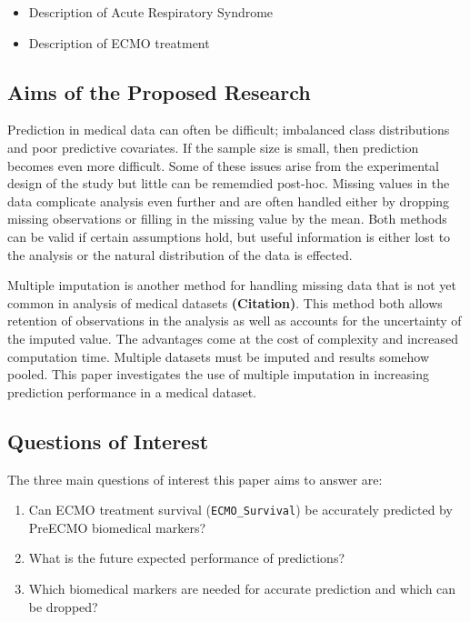 \documentclass[12pt,]{article}
\providecommand{\tightlist}{%
  \setlength{\itemsep}{0pt}\setlength{\parskip}{0pt}}
\begin{document}
\begin{itemize}
\tightlist
\item
  Description of Acute Respiratory Syndrome
\item
  Description of ECMO treatment
\end{itemize}

\subsection{Aims of the Proposed
Research}\label{aims-of-the-proposed-research}

Prediction in medical data can often be difficult; imbalanced class
distributions and poor predictive covariates. If the sample size is
small, then prediction becomes even more difficult. Some of these issues
arise from the experimental design of the study but little can be
rememdied post-hoc. Missing values in the data complicate analysis even
further and are often handled either by dropping missing observations or
filling in the missing value by the mean. Both methods can be valid if
certain assumptions hold, but useful information is either lost to the
analysis or the natural distribution of the data is effected.

Multiple imputation is another method for handling missing data that is
not yet common in analysis of medical datasets \textbf{(Citation)}. This
method both allows retention of observations in the analysis as well as
accounts for the uncertainty of the imputed value. The advantages come
at the cost of complexity and increased computation time. Multiple
datasets must be imputed and results somehow pooled. This paper
investigates the use of multiple imputation in increasing prediction
performance in a medical dataset.

\subsection{Questions of Interest}\label{questions-of-interest}

The three main questions of interest this paper aims to answer are:

\begin{enumerate}
\def\labelenumi{\arabic{enumi}.}
\tightlist
\item
  Can ECMO treatment survival (\texttt{ECMO\_Survival}) be accurately
  predicted by PreECMO biomedical markers?
\item
  What is the future expected performance of predictions?
\item
  Which biomedical markers are needed for accurate prediction and which
  can be dropped?
\end{enumerate}
\end{document}
